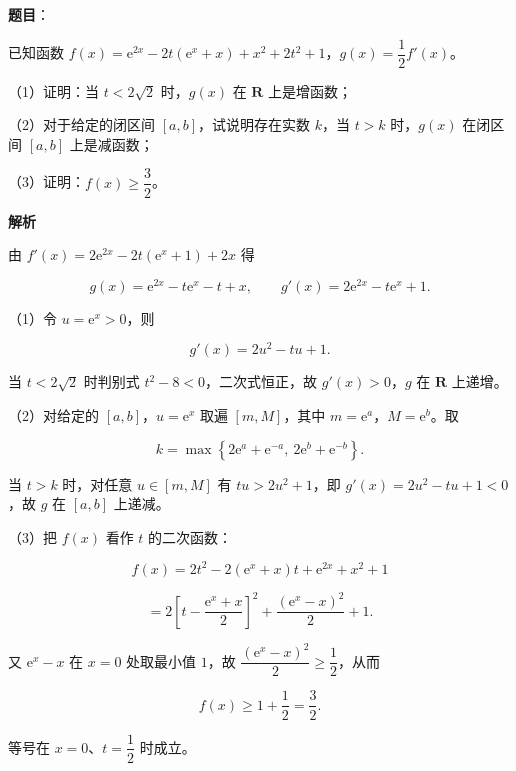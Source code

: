 \begin{answer}

\textbf{题目}：

已知函数 $f(x)=\mathrm e^{2x}-2t(\mathrm e^x+x)+x^2+2t^2+1$，$g(x)=\dfrac12f'(x)$。

（1）证明：当 $t<2\sqrt2$ 时，$g(x)$ 在 $\mathbf R$ 上是增函数；

（2）对于给定的闭区间 $[a,b]$，试说明存在实数 $k$，当 $t>k$ 时，$g(x)$ 在闭区间 $[a,b]$ 上是减函数；

（3）证明：$f(x)\geqslant\dfrac32$。

\textbf{解析}

由 $f'(x)=2\mathrm e^{2x}-2t(\mathrm e^x+1)+2x$ 得

\nopagebreak[4]
\[g(x)=\mathrm e^{2x}-t\mathrm e^x-t+x,\qquad g'(x)=2\mathrm e^{2x}-t\mathrm e^x+1.\]

（1）令 $u=\mathrm e^x>0$，则

\nopagebreak[4]
\[g'(x)=2u^2-tu+1.\]

当 $t<2\sqrt2$ 时判别式 $t^2-8<0$，二次式恒正，故 $g'(x)>0$，$g$ 在 $\mathbf R$ 上递增。

（2）对给定的 $[a,b]$，$u=\mathrm e^x$ 取遍 $[m,M]$，其中 $m=\mathrm e^a$，$M=\mathrm e^b$。取

\nopagebreak[4]
\[k=\max\left\{2\mathrm e^a+\mathrm e^{-a},\ 2\mathrm e^b+\mathrm e^{-b}\right\}.\]

当 $t>k$ 时，对任意 $u\in[m,M]$ 有 $tu>2u^2+1$，即 $g'(x)=2u^2-tu+1<0$，故 $g$ 在 $[a,b]$ 上递减。

（3）把 $f(x)$ 看作 $t$ 的二次函数：

\nopagebreak[4]
\[f(x)=2t^2-2(\mathrm e^x+x)t+\mathrm e^{2x}+x^2+1\]

\nopagebreak[4]
\[=2\left[t-\frac{\mathrm e^x+x}2\right]^2+\frac{(\mathrm e^x-x)^2}2+1.\]

又 $\mathrm e^x-x$ 在 $x=0$ 处取最小值 $1$，故 $\dfrac{(\mathrm e^x-x)^2}2\geqslant\dfrac12$，从而

\nopagebreak[4]
\[f(x)\geqslant 1+\frac12=\frac32.\]

等号在 $x=0$、$t=\dfrac12$ 时成立。


\end{answer}